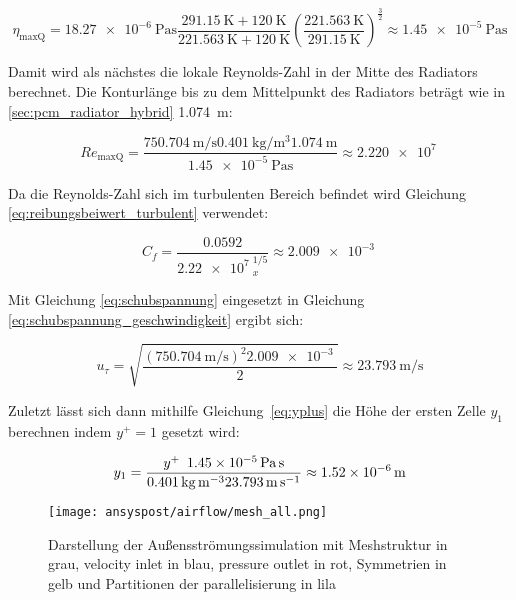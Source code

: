 \begin{equation*}
  \eta_\mathrm{max Q} = \SI{18,27e-6}{\pascal\second} \frac{\SI{291,15}{\kelvin} + \SI{120}{\kelvin}}{\SI{221,563}{\kelvin} + \SI{120}{\kelvin}} {\left( \frac{\SI{221,563}{\kelvin}}{\SI{291,15}{\kelvin}} \right)}^{\frac{3}{2}} \approx \SI{1,45e-5}{\pascal\second}
\end{equation*}

Damit wird als nächstes die lokale Reynolds-Zahl in der Mitte des Radiators berechnet. Die Konturlänge bis zu dem Mittelpunkt des Radiators beträgt wie in \ref{sec:pcm_radiator_hybrid} \SI{1,074}{\meter}:

\begin{equation*}
  Re_{\mathrm{maxQ}} = \frac{\SI{750,704}{\meter\per\second} \SI{0,401}{\kilogram\per\meter\cubed} \SI{1,074}{\meter}}{\SI{1,45e-5}{\pascal\second}} \approx \SI{2,220e7}{}
\end{equation*}

Da die Reynolds-Zahl sich im turbulenten Bereich befindet wird Gleichung \ref{eq:reibungsbeiwert_turbulent} verwendet:

\begin{equation*}
  C_f = \frac{0.0592}{{\SI{2,22e7}{}}_x^{1/5}} \approx \SI{2,009e-3}{}
\end{equation*}

Mit Gleichung \ref{eq:schubspannung} eingesetzt in Gleichung \ref{eq:schubspannung_geschwindigkeit} ergibt sich:

\begin{equation*}
  u_{\tau} = \sqrt{\frac{\left(\SI{750,704}{\meter\per\second}\right)^2 \SI{2,009e-3}{}}{2}} \approx \SI{23,793}{\meter\per\second}
\end{equation*}

Zuletzt lässt sich dann mithilfe Gleichung~\ref{eq:yplus} die Höhe der ersten Zelle $y_1$ berechnen indem $y^+ = 1$ gesetzt wird:

\begin{equation*}
  y_1 = \frac{y^+ \hspace{0.5em} \SI{1,45e-5}{\pascal\second}}{\SI{0,401}{\kilogram\per\meter\cubed} \SI{23,793}{\meter\per\second}} \approx \SI{1,52e-6}{\meter}
\end{equation*}

\begin{figure}
  \centering
  \texttt{[image: ansyspost/airflow/mesh\_all.png]}
  \caption{Darstellung der Außensströmungssimulation mit Meshstruktur in grau, velocity inlet in blau, pressure outlet in rot, Symmetrien in gelb und Partitionen der parallelisierung in lila}\label{fig:aussenstroemung_mesh}
\end{figure}


